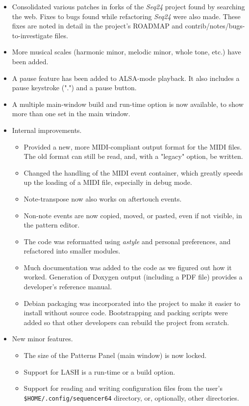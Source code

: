 \documentclass[
 11pt,
 twoside,
 a4paper,
 headinclude,
 footinclude,
 final                                 %
]{article}
\begin{document}
\begin{itemize}
      \item Consolidated various patches in forks of the \textsl{Seq24}
         project found by searching the web.  Fixes to bugs found while
         refactoring \textsl{Seq24} were also made.  These fixes are noted in
         detail in the project's ROADMAP and contrib/notes/bugs-to-investigate
         files.
      \item More musical scales (harmonic minor, melodic minor,
         whole tone, etc.) have been added.
      \item A pause feature has been added to ALSA-mode playback.
         It also includes a pause keystroke (".") and a pause button.
      \item A multiple main-window build and run-time option is now available,
         to show more than one set in the main window.
      \item Internal improvements.
      \begin{itemize}
         \item Provided a new, more MIDI-compliant output format for the MIDI
            files.  The old format can still be read, and, with a "legacy"
            option, be written.
         \item Changed the handling of the MIDI event container, which greatly
            speeds up the loading of a MIDI file, especially in debug mode.
         \item Note-transpose now also works on aftertouch events.
         \item Non-note events are now copied, moved, or pasted, even if not
            visible, in the pattern editor.
         \item The code was reformatted using \textsl{astyle} and
            personal preferences, and refactored into smaller modules.
         \item Much documentation was added to the code as we figured
            out how it worked.  Generation of Doxygen output (including a PDF
            file) provides a developer's reference manual.
         \item Debian packaging was incorporated into the project to make it
            easier to install without source code.  Bootstrapping and
            packing scripts were added so that other developers can rebuild the
            project from scratch.
      \end{itemize}
      \item New minor features.
      \begin{itemize}
         \item The size of the Patterns Panel (main window) is now locked.
         \item Support for LASH is a run-time or a build option.
         \item Support for reading and writing configuration files from the
            user's \texttt{\$HOME/.config/sequencer64} directory, or,
            optionally, other directories.
      \end{itemize}
   \end{itemize}
\end{document}
